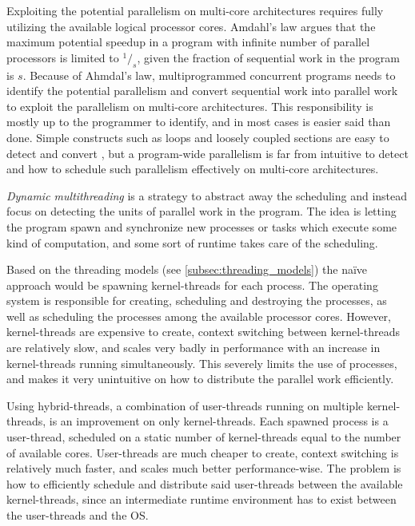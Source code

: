 Exploiting the potential parallelism on multi\hyp{}core architectures requires fully utilizing the available logical processor cores. Amdahl's law \citep{amdahl1967validity} argues that the maximum potential speedup in a program with infinite number of parallel processors is limited to $^1/_s$, given the fraction of sequential work in the program is $s$. Because of Ahmdal's law, multiprogrammed concurrent programs needs to identify the potential parallelism and convert sequential work into parallel work to exploit the parallelism on multi\hyp{}core architectures. This responsibility is mostly up to the programmer to identify, and in most cases is easier said than done. Simple constructs such as loops and loosely coupled sections are easy to detect and convert \citep{dagum1998openmp,robison2013composable}, but a program\hyp{}wide parallelism is far from intuitive to detect and how to schedule such parallelism effectively on multi\hyp{}core architectures. 

\textit{Dynamic multithreading} is a strategy to abstract away the scheduling and instead focus on detecting the units of parallel work in the program. The idea is letting the program spawn and synchronize new processes or tasks which execute some kind of computation, and some sort of runtime takes care of the scheduling.

Based on the threading models (see \cref{subsec:threading_models}) the naïve approach would be spawning kernel\hyp{}threads for each process. The operating system is responsible for creating, scheduling and destroying the processes, as well as scheduling the processes among the available processor cores. However, kernel\hyp{}threads are expensive to create, context switching between kernel\hyp{}threads are relatively slow, and scales very badly in performance with an increase in kernel\hyp{}threads running simultaneously. This severely limits the use of processes, and makes it very unintuitive on how to distribute the parallel work efficiently.

Using hybrid\hyp{}threads, a combination of user\hyp{}threads running on multiple kernel\hyp{}threads, is an improvement on only kernel\hyp{}threads. Each spawned process is a user\hyp{}thread, scheduled on a static number of kernel\hyp{}threads equal to the number of available cores. User\hyp{}threads are much cheaper to create, context switching is relatively much faster, and scales much better performance\hyp{}wise. The problem is how to efficiently schedule and distribute said user\hyp{}threads between the available kernel\hyp{}threads, since an intermediate runtime environment has to exist between the user\hyp{}threads and the OS.

